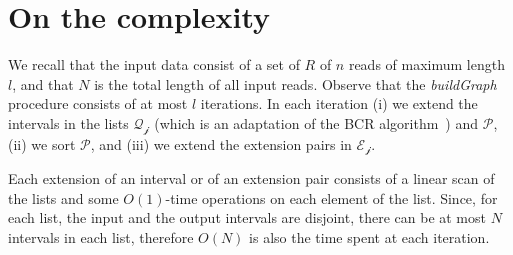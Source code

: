 \documentclass[runningheads,envcountsame,a4paper]{llncs}
\begin{document}
\section{On the complexity}





We recall that the input data consist of a set of  $R$ of $n$ reads of maximum
length $l$, and that $N$ is the total length of all input reads.
Observe that the \emph{buildGraph} procedure consists of  at most $l$ iterations.
In each iteration (i) we extend the intervals in the lists $\mathcal{Q_{j}}$ (which is an
adaptation of the BCR algorithm~\cite{Bauer2013}) and $\mathcal P$, (ii) we sort
$\mathcal P$, and (iii) we extend the extension pairs in $\mathcal{E_{j}}$.

Each extension of an interval or of an extension pair consists of a linear scan
of the lists and some $O(1)$-time operations on each element of the list.
Since, for each list, the input and the output intervals are disjoint, there can
be at most $N$ intervals in each list, therefore $O(N)$ is also the time spent
at each iteration.


\begin{comment}
times the procedures ExtendQonLeft and ExtendQonRight.
In fact, those two procedures
apply the backward extension to every $Q$-interval in $\mathcal{Q}_j$ at
most $l$ times, since there can't be any interval related to a pattern
$Q$ such that $|Q| > l$. %

On the other hand the procedures ExtendQonLeft and ExtendQonRight aim to
build all the possible $Q$-intervals linked to the maximal overlaps
between the reads (the irreducible edges of the String Graph) by means of
an incremental approach that rely on the computation of the
$Q$-intervals during the previous steps.

Thus, the time complexity of these procedures may be measured by
considering the total number of possible $Q$-intervals that we have to
compute for every length of $Q$ (more precisely for $|Q| \in \{1 \dots
l\}$).

Then the total  complexity of ExtendQonLeft and ExtendQonRight is at
most $O(N_Q)$, where $N_Q$ is the total number of
$Q$-intervals (i.e. distinct substrings of $R$).

An estimate of $N_Q$ can be given as $O(l \times n)$ (let us recall that
the number of distinct strings in a word on length $x$ is  at most $x$
((Trovare articolo e citare)\cite{})).
\end{comment}
\end{document}
